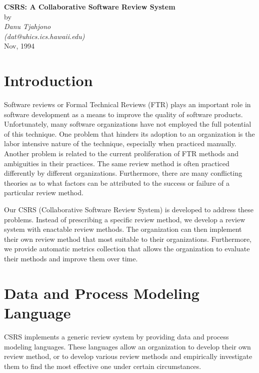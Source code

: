 



\begin{center}
{\Large\bf CSRS: A Collaborative Software Review System}\\
\vspace {.2in}
by\\
\vspace {.2in}
{\em Danu Tjahjono\\
(dat@uhics.ics.hawaii.edu)}\\
Nov, 1994
\vspace {.4in}
\end{center}

\section{Introduction}

Software reviews or Formal Technical Reviews (FTR) plays
an important role in software development as a means to
improve the quality of software products. Unfortunately, many
software organizations have not employed the full potential of
this technique.  One problem that hinders its adoption to an
organization is the labor intensive nature of the technique,
especially when practiced manually. Another problem is related to 
the current proliferation of FTR methods and ambiguities in their 
practices. The same review method is often practiced differently by
different organizations. Furthermore, there are many conflicting
theories as to
what factors can be attributed to the success or failure of a
particular review method. 

Our CSRS (Collaborative Software Review System) is developed to address
these problems. Instead of prescribing a specific review method, we
develop a review system with enactable review methods.
The organization can then implement their own review method
that most suitable to their organizations. Furthermore, we provide
automatic metrics collection that allows the organization to
evaluate their methods and improve them over time.

\section{Data and Process Modeling Language}

CSRS implements a generic review system by providing data and
process modeling languages.  
These languages allow an organization to develop their own review
method, or to develop various review methods and empirically
investigate them to find the most effective one under certain
circumstances. 

